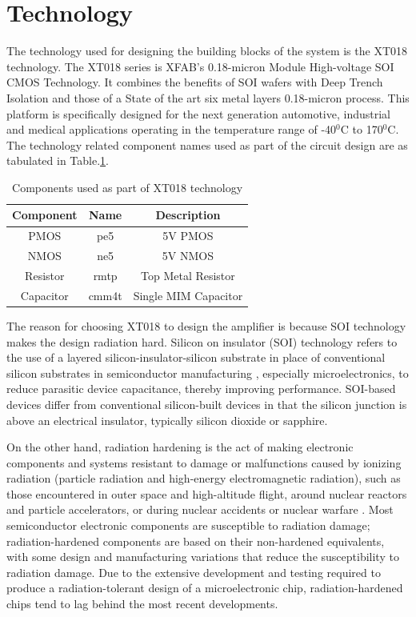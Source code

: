 \vfill
\clearpage

\section{Technology}

The technology used for designing the building blocks of the system is the XT018 technology. The XT018 series is XFAB's 0.18-micron Module High-voltage SOI CMOS Technology. It combines the benefits of SOI wafers with Deep Trench Isolation and those of a State of the art six metal layers 0.18-micron process\cite{xt018}. This platform is specifically designed for the next generation automotive, industrial and medical applications operating in the temperature range of -40$^0$C to 170$^0$C. The technology related component names used as part of the circuit design are as tabulated in Table.\ref{tab:Components}.

\begin{table} [H]
\centering
\begin{tabular}{@{}ccc@{}}
\toprule
Component	& Name		& Description			\\ \midrule
PMOS		& pe5		& 5V PMOS				\\
NMOS		& ne5		& 5V NMOS				\\
Resistor	& rmtp		& Top Metal Resistor	\\
Capacitor	& cmm4t		& Single MIM Capacitor	\\
\bottomrule
\end{tabular}
\caption{Components used as part of XT018 technology}
\label{tab:Components}
\end{table}

The reason for choosing XT018 to design the amplifier is because SOI technology makes the design radiation hard. Silicon on insulator (SOI) technology refers to the use of a layered silicon-insulator-silicon substrate in place of conventional silicon substrates in semiconductor manufacturing \cite{soi_tech}, especially microelectronics, to reduce parasitic device capacitance, thereby improving performance. SOI-based devices differ from conventional silicon-built devices in that the silicon junction is above an electrical insulator, typically silicon dioxide or sapphire. 

On the other hand, radiation hardening is the act of making electronic components and systems resistant to damage or malfunctions caused by ionizing radiation (particle radiation and high-energy electromagnetic radiation), such as those encountered in outer space and high-altitude flight, around nuclear reactors and particle accelerators, or during nuclear accidents or nuclear warfare \cite{radhard}. Most semiconductor electronic components are susceptible to radiation damage; radiation-hardened components are based on their non-hardened equivalents, with some design and manufacturing variations that reduce the susceptibility to radiation damage. Due to the extensive development and testing required to produce a radiation-tolerant design of a microelectronic chip, radiation-hardened chips tend to lag behind the most recent developments.